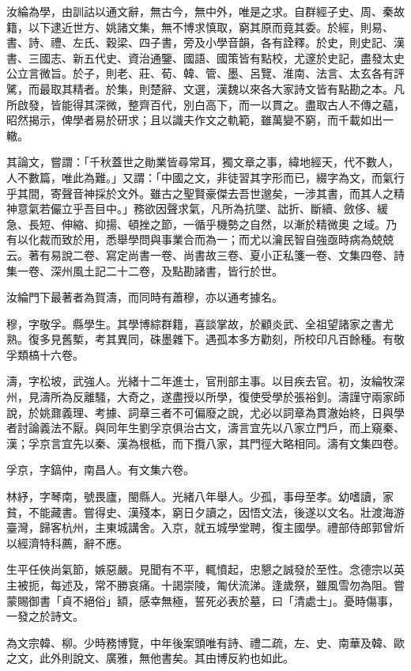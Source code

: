 \begin{pinyinscope}
汝綸為學，由訓詁以通文辭，無古今，無中外，唯是之求。自群經子史、周、秦故籍，以下逮近世方、姚諸文集，無不博求慎取，窮其原而竟其委。於經，則易、書、詩、禮、左氏、穀梁、四子書，旁及小學音韻，各有詮釋。於史，則史記、漢書、三國志、新五代史、資治通鑒、國語、國策皆有點校，尤邃於史記，盡發太史公立言微旨。於子，則老、莊、荀、韓、管、墨、呂覽、淮南、法言、太玄各有評騭，而最取其精者。於集，則楚辭、文選，漢魏以來各大家詩文皆有點勘之本。凡所啟發，皆能得其深微，整齊百代，別白高下，而一以貫之。盡取古人不傳之蘊，昭然揭示，俾學者易於研求；且以識夫作文之軌範，雖萬變不窮，而千載如出一轍。

其論文，嘗謂：「千秋蓋世之勛業皆尋常耳，獨文章之事，緯地經天，代不數人，人不數篇，唯此為難。」又謂：「中國之文，非徒習其字形而已，綴字為文，而氣行乎其間，寄聲音神採於文外。雖古之聖賢豪傑去吾世邈矣，一涉其書，而其人之精神意氣若儼立乎吾目中。」務欲因聲求氣，凡所為抗墜、詘折、斷續、斂侈、緩急、長短、伸縮、抑揚、頓挫之節，一循乎機勢之自然，以漸於精微奧之域。乃有以化裁而致於用，悉舉學問與事業合而為一；而尤以瀹民智自強亟時病為兢兢云。著有易說二卷、寫定尚書一卷、尚書故三卷、夏小正私箋一卷、文集四卷、詩集一卷、深州風土記二十二卷，及點勘諸書，皆行於世。

汝綸門下最著者為賀濤，而同時有蕭穆，亦以通考據名。

穆，字敬孚。縣學生。其學博綜群籍，喜談掌故，於顧炎武、全祖望諸家之書尤熟。復多見舊槧，考其異同，硃墨雜下。遇孤本多方勸刻，所校印凡百餘種。有敬孚類槁十六卷。

濤，字松坡，武強人。光緒十二年進士，官刑部主事。以目疾去官。初，汝綸牧深州，見濤所為反離騷，大奇之，遂盡授以所學，復使受學於張裕釗。濤謹守兩家師說，於姚鼐義理、考據、詞章三者不可偏廢之說，尤必以詞章為貫澈始終，日與學者討論義法不厭。與同年生劉孚京俱治古文，濤言宜先以八家立門戶，而上窺秦、漢；孚京言宜先以秦、漢為根柢，而下攬八家，其門徑大略相同。濤有文集四卷。

孚京，字鎬仲，南昌人。有文集六卷。

林紓，字琴南，號畏廬，閩縣人。光緒八年舉人。少孤，事母至孝。幼嗜讀，家貧，不能藏書。嘗得史、漢殘本，窮日夕讀之，因悟文法，後遂以文名。壯渡海游臺灣，歸客杭州，主東城講舍。入京，就五城學堂聘，復主國學。禮部侍郎郭曾炘以經濟特科薦，辭不應。

生平任俠尚氣節，嫉惡嚴。見聞有不平，輒憤起，忠懇之誠發於至性。念德宗以英主被扼，每述及，常不勝哀痛。十謁崇陵，匍伏流涕。逢歲祭，雖風雪勿為阻。嘗蒙賜御書「貞不絕俗」額，感幸無極，誓死必表於墓，曰「清處士」。憂時傷事，一發之於詩文。

為文宗韓、柳。少時務博覽，中年後案頭唯有詩、禮二疏，左、史、南華及韓、歐之文，此外則說文、廣雅，無他書矣。其由博反約也如此。


\end{pinyinscope}
